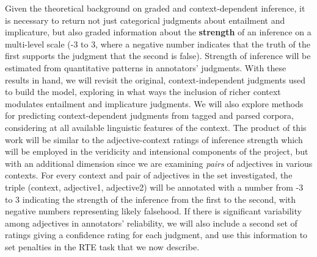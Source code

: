 \documentclass[10pt]{article}
\begin{document}
Given the theoretical background on graded and context-dependent inference, it is necessary to return not just categorical judgments about entailment and implicature, but also graded information about the \textbf{strength} of an inference on a multi-level scale (-3 to 3, where a negative number indicates that the truth of the first supports the judgment that the second is false).  Strength of inference will be estimated from quantitative patterns in annotators' judgments. With these results in hand, we will revisit the original, context-independent judgments used to build the model, exploring in what ways the inclusion of richer context modulates entailment and implicature judgments. We will also explore methods for predicting context-dependent judgments from tagged and parsed corpora, considering at all available linguistic features of the context. The product of this work will be similar to the adjective-context ratings of inference strength which will be employed in the veridicity and intensional components of the project, but with an additional dimension since we are examining \emph{pairs} of adjectives in various contexts. For every context and pair of adjectives in the set investigated, the triple  (context, adjective1, adjective2) will be annotated with a number from -3 to 3 indicating the strength of the inference from the first to the second, with negative numbers representing likely falsehood. If there is significant variability among adjectives in annotators' reliability, we will also include a second set of ratings giving a confidence rating for each judgment, and use this information to set penalties in the RTE task that we now describe.
\end{document}
